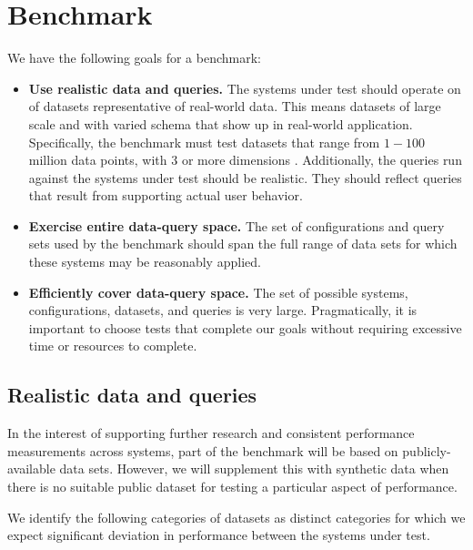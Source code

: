\documentclass[journal]{vgtc}                %
\begin{document}
\section{Benchmark}


We have the following goals for a benchmark:

\begin{itemize}
	\item \textbf{Use realistic data and queries.} The systems under test
		should operate on of datasets representative of real-world data. This
		means datasets of large scale and with varied schema that show up in
		real-world application. Specifically, the benchmark must test datasets
		that range from $1-100$ million data points, with $3$ or more dimensions
		\cite{...}.  Additionally, the queries run against the systems
		under test should be realistic.  They should reflect queries that
		result from supporting actual user behavior.

	\item \textbf{Exercise entire data-query space.} The set of configurations
		and query sets used by the benchmark should span the full range of data
		sets for which these systems may be reasonably applied. 
		
	\item \textbf{Efficiently cover data-query space.} The set of possible
		systems, configurations, datasets, and queries is very large.
		Pragmatically, it is important to choose tests that complete our goals
		without requiring excessive time or resources to complete.

\end{itemize}

\subsection{Realistic data and queries}

In the interest of supporting further research and consistent performance measurements across systems, part of the benchmark will be based on publicly-available data sets. However, we will supplement this with synthetic data when there is no suitable public dataset for testing a particular aspect of performance.

We identify the following categories of datasets as distinct categories for which we expect significant deviation in performance between the systems under test. 
\end{document}
